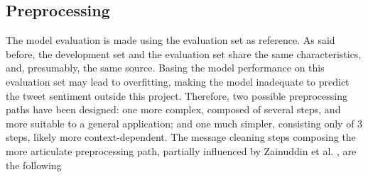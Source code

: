 \documentclass[conference]{IEEEtran}
\begin{document}
\subsection{Preprocessing}
The model evaluation is made using the evaluation set as reference. As said before, the development set and the evaluation set share the same characteristics, and, presumably, the same source. Basing the model performance on this evaluation set may lead to overfitting, making the model inadequate to predict the tweet sentiment outside this project. Therefore, two possible preprocessing paths have been designed: one more complex, composed of several steps, and more suitable to a general application; and one much simpler, consisting only of 3 steps, likely more context-dependent. The message cleaning steps composing the more articulate preprocessing path, partially influenced by Zainuddin et al. \cite{ZainuddinNurulhuda2016TFSa}, are the following
\end{document}
